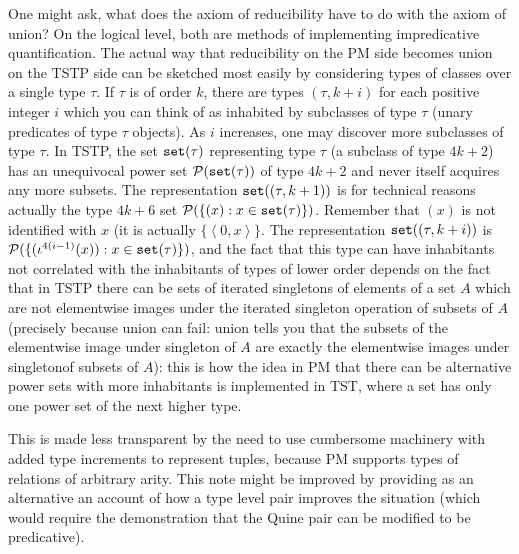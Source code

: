 \documentclass[12pt]{article}
\begin{document}
One might ask, what does the axiom of reducibility have to do with the axiom of union?  On the logical level, both are methods of implementing impredicative quantification.  The actual way that reducibility on the PM side becomes union on the TSTP side can be sketched most easily by considering types of classes over a single type $\tau$.  If $\tau$ is of order $k$, there are types $(\tau,k+i)$ for each positive integer $i$ which you can think of as inhabited by subclasses of type $\tau$ (unary predicates of type $\tau$ objects).  As $i$ increases, one may discover more subclasses of type $\tau$.
In TSTP, the set ${\tt set}(\tau)$ representing type $\tau$ (a subclass of type $4k+2$) has an unequivocal power set ${\cal P}({\tt set}(\tau))$ of type $4k+2$ and never itself acquires any more subsets.  The representation ${\tt set}((\tau,k+1))$ is for technical reasons actually the type
$4k+6$ set ${\cal P}(\{(x):x \in {\tt set}(\tau)\})$.  Remember that $(x)$ is not identified with $x$ (it is actually $\{\left<0,x\right>\}$.  The representation
 ${\tt set}((\tau,k+i))$ is  ${\cal P}(\{(\iota^{4(i-1)}(x)):x \in {\tt set}(\tau)\})$, and the fact that this type can have inhabitants not correlated with the inhabitants of types of lower order  depends on the fact that in TSTP there can be sets of iterated singletons of elements of a set $A$ which are not elementwise images under the iterated singleton operation of subsets of $A$ (precisely because union can fail:  union tells you that the subsets of the elementwise image under singleton of $A$ are exactly the elementwise images under singletonof subsets of $A$):  this is how the idea in PM that there can be alternative power sets with more inhabitants is implemented in TST, where a set has only one power set of the next higher type.

This is made less transparent by the need to use cumbersome machinery with added type increments to represent tuples, because PM supports types of relations of arbitrary arity.  This note might be improved by providing as an alternative an account of how a type level pair improves the situation (which would require the demonstration that the Quine pair can be modified to be predicative).
\end{document}
